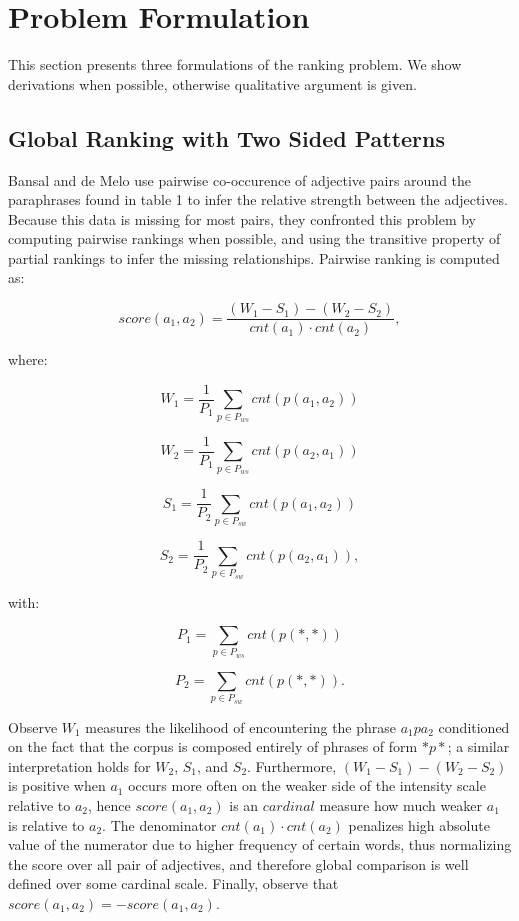 

\section{Problem Formulation}

This section presents three formulations of the ranking problem. We show derivations when possible, otherwise qualitative argument is given.

\subsection{Global Ranking with Two Sided Patterns}

Bansal and de Melo  use pairwise co-occurence of adjective pairs around the paraphrases found in table 1 to infer the relative strength between the adjectives. Because this data is missing for most pairs, they confronted this problem by computing pairwise rankings when possible, and using the transitive property of partial rankings to infer the missing relationships. Pairwise ranking is computed as:

\[ score(a_1, a_2) = \frac{(W_1 - S_1) - (W_2 - S_2)}{cnt(a_1) \cdot cnt(a_2)}, \]

where:

\[ W_1 = \frac{1}{P_1} \sum_{p \in P_{ws}} cnt(p(a_1, a_2))\]

\[ W_2 = \frac{1}{P_1} \sum_{p \in P_{ws}} cnt(p(a_2, a_1))\]

\[ S_1 = \frac{1}{P_2} \sum_{p \in P_{sw}} cnt(p(a_1, a_2))\]

\[ S_2 = \frac{1}{P_2} \sum_{p \in P_{sw}} cnt(p(a_2, a_1)),\]

with:

\[ P_1 = \sum_{p \in P_{ws}} cnt(p(*, *))\]

\[ P_2 = \sum_{p \in P_{sw}} cnt(p(*, *)).\]


Observe $W_1$ measures the likelihood of encountering the phrase $a_1 p a_2$ conditioned on the fact that the corpus is composed 
entirely of phrases of form $* p *$; a similar interpretation holds for $W_2$, $S_1$, and $S_2$. Furthermore, $(W_1 - S_1) - (W_2 - S_2)$ is positive when $a_1$ occurs more often on the weaker side of the intensity scale relative to $a_2$, hence $score(a_1, a_2)$ is an $cardinal$ measure how much weaker $a_1$ is relative to $a_2$. The denominator $cnt(a_1) \cdot cnt(a_2)$ penalizes high absolute value of the numerator due to higher frequency of certain words, thus normalizing the score over all pair of adjectives, and therefore global comparison is well defined over some cardinal scale. Finally, observe that $score(a_1, a_2) = - score(a_1, a_2)$.

